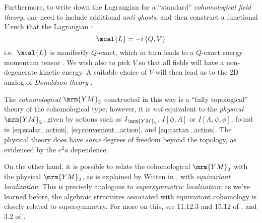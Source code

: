 \documentclass[a4paper
	,10pt
]{article}
\newcommand{\YM}{{\ensuremath{\mrm{YM}_2}}\xspace}
\begin{document}
	Furthermore, to write down the Lagrangian for a ``standard'' \textit{cohomological field theory}, one need to include additional \textit{anti-ghosts}, and then construct a functional $V$ such that the Lagrangian \cite{Witten:1992xu}:
	\begin{equation}
		\mcal{L} = -i\,\{Q,V\}
	\label{eq:coh_action}
	\end{equation}
	i.e.~$\mcal{L}$ is manifestly $Q$-exact, which in turn leads to a $Q$-exact energy momentum tensor \cite{Cordes:1994fc}. We wish also to pick $V$ so that all fields will have a non-degenerate kinetic energy. A suitable choice of $V$ will then lead us to the 2D analog of \textit{Donaldson theory} \cite{Witten:1992xu}. 
	
	The \textit{cohomological \YM} constructed in this way is a ``fully topological'' theory of the cohomological type; however, it is \textit{not} equivalent to the \textit{physical \YM}, given by actions such as $I_\YM$, $I[\phi,A]$ or $I[A,\psi,\phi]$, found in \eqref{eq:scalar_action}, \eqref{eq:convenient_action}, and \eqref{eq:cartan_action}. The physical theory does have \textit{some} degrees of freedom beyond the topology, as evidenced by the $e^2 a$ dependence. 
	
	On the other hand, it is possible to relate the cohomological \YM with the physical \YM, as is explained by Witten in \cite{Witten:1992xu}, with \textit{equivariant localization}. This is precisely analogous to \textit{supersymmetric localization}; as we've learned before, the algebraic structures associated with equivariant cohomology is closely related to supersymmetry. For more on this, see 11.12.3 and 15.12 of \cite{Cordes:1994fc}, and 3.2 of \cite{Witten:1992xu}. 



\vspace{1.2\baselineskip}
\raggedright
\setlength{\bibitemsep}{6bp}
\renewcommand*{\bibfont}{\linespread{1.12}\selectfont}


\printbibliography[%
	,heading = bibintoc
]
\end{document}
